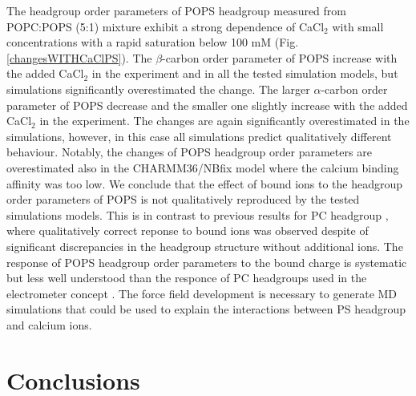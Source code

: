 \documentclass[aps,prl,superscriptaddress,twocolumn]{revtex4}
\begin{document}
The headgroup order parameters of POPS headgroup measured from POPC:POPS (5:1) mixture
exhibit a strong dependence of CaCl$_2$ with small concentrations with a rapid saturation
below 100 mM (Fig. \ref{changesWITHCaClPS}). The $\beta$-carbon order parameter of
POPS increase with the added CaCl$_2$ in the experiment and in all the tested simulation models,
but simulations significantly overestimated the change. The larger $\alpha$-carbon order
parameter of POPS decrease and the smaller one slightly increase with the added
CaCl$_2$ in the experiment. The changes are again significantly overestimated in
the simulations, however, in this case all simulations predict qualitatively different
behaviour. Notably, the changes of POPS headgroup order parameters are overestimated
also in the CHARMM36/NBfix model where the calcium binding affinity was too low. 
We conclude that the effect of bound ions to the headgroup order parameters of POPS
is not qualitatively reproduced by the tested simulations models. This is in contrast
to previous results for PC headgroup \cite{catte16}, where qualitatively correct reponse to bound ions was
observed despite of significant discrepancies in the headgroup structure without additional ions. 
The response of POPS headgroup order parameters to the bound charge is systematic but
less well understood than the responce of PC headgroups used in the electrometer
concept \cite{seelig87,roux90}. The force field development is necessary to
generate MD simulations that could be used to explain the interactions between
PS headgroup and calcium ions.


\section{Conclusions}


%

\begin{acknowledgments}
\end{acknowledgments}

\newpage





\listoftodos
\end{document}
